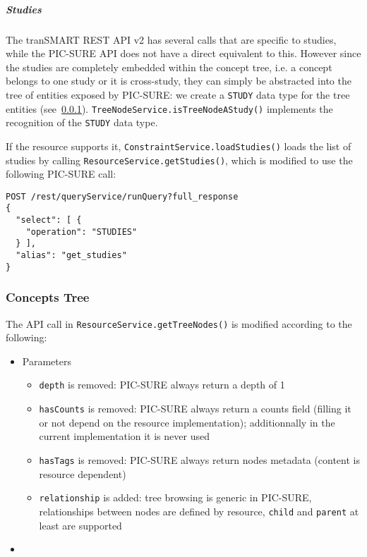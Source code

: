 
\subparagraph{Studies}

The tranSMART REST API v2 has several calls that are specific to studies, while the PIC-SURE API does not have a direct equivalent to this.
However since the studies are completely embedded within the concept tree, i.e. a concept belongs to one study or it is cross-study, they can simply be abstracted into the tree of entities exposed by PIC-SURE: we create a \verb|STUDY| data type for the tree entities (see~\ref{sec:gb-tree}).
\verb|TreeNodeService.isTreeNodeAStudy()| implements the recognition of the \verb|STUDY| data type.

If the resource supports it, \verb|ConstraintService.loadStudies()| loads the list of studies by calling \verb|ResourceService.getStudies()|, which is modified to use the following PIC-SURE call:
\begin{verbatim}
POST /rest/queryService/runQuery?full_response
{
  "select": [ {
    "operation": "STUDIES"
  } ],
  "alias": "get_studies"
}
\end{verbatim}



\subsubsection{Concepts Tree}
\label{sec:gb-tree}

The API call in \verb|ResourceService.getTreeNodes()| is modified according to the following:
\begin{itemize}
    \item Parameters
    \begin{itemize}
        \item \verb|depth| is removed: PIC-SURE always return a depth of 1
        \item \verb|hasCounts| is removed: PIC-SURE always return a counts field (filling it or not depend on the resource implementation); additionnally in the current implementation it is never used
        \item \verb|hasTags| is removed: PIC-SURE always return nodes metadata (content is resource dependent)
        \item \verb|relationship| is added: tree browsing is generic in PIC-SURE, relationships between nodes are defined by resource, \verb|child| and \verb|parent| at least are supported
    \end{itemize}
    \item 
\end{itemize}

